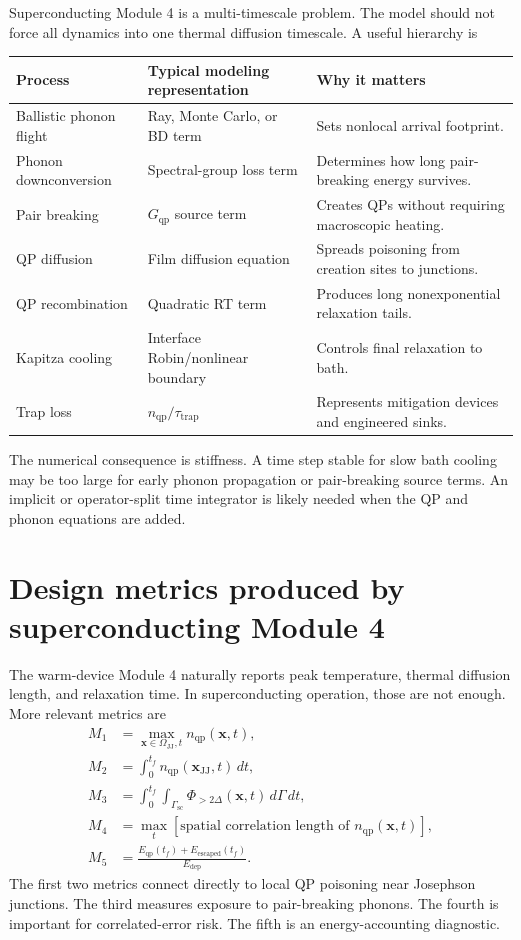 \documentclass[11pt]{article}
\newcommand{\nqp}{n_{\mathrm{qp}}}
\newcommand{\x}{\mathbf{x}}
\begin{document}
Superconducting Module 4 is a multi-timescale problem. The model should not force all dynamics into one thermal diffusion timescale. A useful hierarchy is
\begin{center}
\begin{tabularx}{0.96\textwidth}{>{\RaggedRight\arraybackslash}p{}>{\RaggedRight\arraybackslash}p{}>{\RaggedRight\arraybackslash}X}
\toprule
Process & Typical modeling representation & Why it matters \\
\midrule
Ballistic phonon flight & Ray, Monte Carlo, or BD term & Sets nonlocal arrival footprint. \\
Phonon downconversion & Spectral-group loss term & Determines how long pair-breaking energy survives. \\
Pair breaking & \(G_{\mathrm{qp}}\) source term & Creates QPs without requiring macroscopic heating. \\
QP diffusion & Film diffusion equation & Spreads poisoning from creation sites to junctions. \\
QP recombination & Quadratic RT term & Produces long nonexponential relaxation tails. \\
Kapitza cooling & Interface Robin/nonlinear boundary & Controls final relaxation to bath. \\
Trap loss & \(n_{\mathrm{qp}}/\tau_{\mathrm{trap}}\) & Represents mitigation devices and engineered sinks. \\
\bottomrule
\end{tabularx}
\end{center}

The numerical consequence is stiffness. A time step stable for slow bath cooling may be too large for early phonon propagation or pair-breaking source terms. An implicit or operator-split time integrator is likely needed when the QP and phonon equations are added.

\section{Design metrics produced by superconducting Module 4}

The warm-device Module 4 naturally reports peak temperature, thermal diffusion length, and relaxation time. In superconducting operation, those are not enough. More relevant metrics are
\begin{align}
M_1 &= \max_{\x\in\Omega_{\mathrm{JJ}},t}\nqp(\x,t),\\
M_2 &= \int_{0}^{t_f}\nqp(\x_{\mathrm{JJ}},t)\,dt,\\
M_3 &= \int_{0}^{t_f}\int_{\Gamma_{\mathrm{sc}}} \Phi_{>2\Delta}(\x,t)\,d\Gamma\,dt,\\
M_4 &= \max_t \left[\text{spatial correlation length of }\nqp(\x,t)\right],\\
M_5 &= \frac{E_{\mathrm{qp}}(t_f)+E_{\mathrm{escaped}}(t_f)}{E_{\mathrm{dep}}}.
\end{align}
The first two metrics connect directly to local QP poisoning near Josephson junctions. The third measures exposure to pair-breaking phonons. The fourth is important for correlated-error risk. The fifth is an energy-accounting diagnostic.
\end{document}
